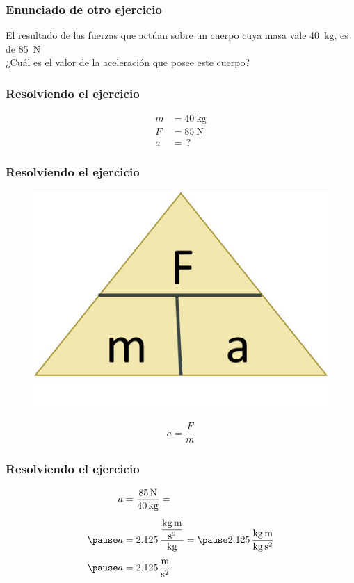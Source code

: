 \documentclass[14pt]{beamer}
\begin{document}
\begin{frame}
\frametitle{Enunciado de otro ejercicio}
El resultado de las fuerzas que actúan sobre un cuerpo cuya masa vale \SI{40}{\kilo\gram}, es de \SI{85}{\newton}
\\
\bigskip
¿Cuál es el valor de la aceleración que posee este cuerpo?
\end{frame}
\begin{frame}
\frametitle{Resolviendo el ejercicio}
\pause
\begin{align*}
m &= \SI{40}{\kilo\gram} \\[0.5em]
F &= \SI{85}{\newton} \\[0.5em]
a &= \, ?
\end{align*}
\end{frame}
\begin{frame}
\frametitle{Resolviendo el ejercicio}
\pause
\begin{figure}
    \centering
    \includegraphics[scale=1]{Imagenes/Newton_11.jpg}
\end{figure}
\pause
\begin{align*}
a = \dfrac{F}{m}
\end{align*}
\end{frame}
\begin{frame}
\frametitle{Resolviendo el ejercicio}
\pause
\begin{eqnarray*}
\begin{aligned}
a &= \dfrac{\SI{85}{\newton}}{\SI{40}{\kilo\gram}} = \\[0.5em] \pause
a &= 2.125 \, \dfrac{\dfrac{\unit{\kilo\gram\meter}}{\unit{\square\second}}}{\unit{\kilo\gram}} = \pause 2.125 \, \dfrac{\unit{\kilo\gram\meter}}{\unit{\kilo\gram\square\second}} \\[0.5em] \pause
a &= \SI[per-mode=fraction]{2.125}{\meter\per\square\second}
\end{aligned}
\end{eqnarray*}
\end{frame}
\end{document}
